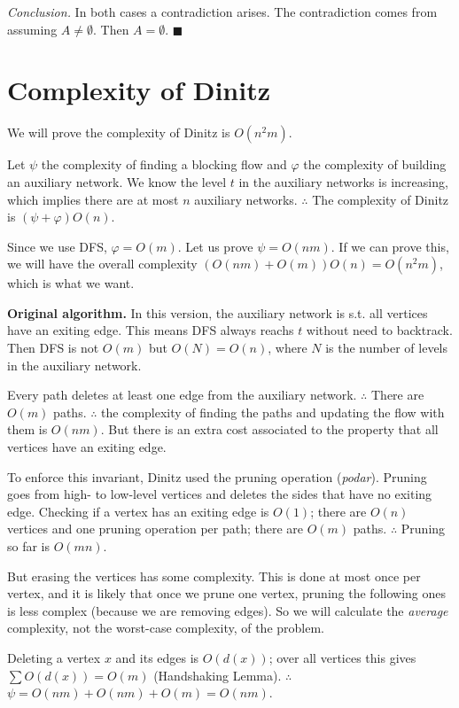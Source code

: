 \documentclass[a4paper, 12pt]{article}
\begin{document}
\textit{Conclusion.} In both cases a contradiction arises. The contradiction
comes from assuming $A \neq \emptyset$. Then $A = \emptyset$. $\blacksquare$


\pagebreak

\section{Complexity of Dinitz}


We will prove the complexity of Dinitz is $O(n^2m)$.

Let $\psi$ the complexity of finding a blocking flow and $\varphi$ the
complexity of building an auxiliary network. We know the level $t$ in the
auxiliary networks is increasing, which implies there are at most $n$ auxiliary
networks. $\therefore $ The complexity of Dinitz is $\left( \psi + \varphi
\right) O(n) $.

Since we use DFS, $\varphi = O(m)$. Let us prove $\psi = O(nm)$. If we can
prove this, we will have the overall complexity $\left( O(nm) + O(m) \right)
O(n) = O(n^2m) $, which is what we want.

\textbf{Original algorithm.} In this version, the auxiliary network is s.t. all
vertices have an exiting edge. This means DFS always reachs $t$ without need to
backtrack. Then DFS is not $O(m)$ but $O(N) = O(n)$, where $N$ is the number of
levels in the auxiliary network.

Every path deletes at least one edge from the auxiliary network. $\therefore $
There are $O(m)$ paths.  $\therefore $ the complexity of finding the 
paths and updating the flow with them is $O(nm)$. But there is 
an extra cost associated to the property that all vertices have an 
exiting edge.

To enforce this invariant, Dinitz used the pruning operation (\textit{podar}).
Pruning goes from high- to low-level vertices and deletes the sides that have
no exiting edge. Checking if a vertex has an exiting edge is $O(1)$; there are
$O(n)$ vertices and one pruning operation per path; there are $O(m)$ paths.
$\therefore $ Pruning so far is $O(mn)$.

But erasing the vertices has some complexity. This is done at most once per
vertex, and it is likely that once we prune one vertex, pruning the following
ones is less complex (because we are removing edges). So we will calculate the
\textit{average} complexity, not the worst-case complexity, of the problem.

Deleting a vertex $x$ and its edges is $O(d(x))$; over all vertices this gives
$\sum O(d(x)) = O(m)$ (Handshaking Lemma).  $\therefore $ $\psi = O(nm) + O(nm)
+ O(m)= O(nm)$.
\end{document}
